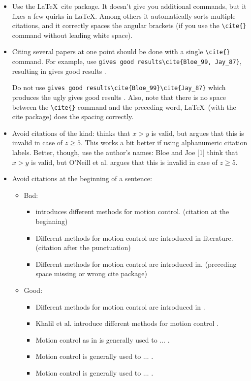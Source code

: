 \begin{itemize}
\item Use the \LaTeX~cite package. It doesn't give you additional commands, but it fixes a few quirks in \LaTeX. Among others it automatically sorts multiple citations, and it correctly spaces the angular brackets (if you use the \verb|\cite{}| command without leading white space).

\item Citing several papers at one point should be done with a single \verb|\cite{}| command. For example, use \verb|gives good results\cite{Bloe_99, Jay_87}|, resulting in gives good results \cite{Bloe_99, Jay_87}.

Do not use \verb|gives good results\cite{Bloe_99}\cite{Jay_87}| which produces the ugly gives good results \cite{Bloe_99}\cite{Jay_87}. Also, note that there is no space between the \verb|\cite{}| command and the preceding word, \LaTeX~(with the cite package) does the spacing correctly.

\item Avoid citations of the kind: \cite{Bloe_99} thinks that $x>y$ is valid, but \cite{ONeill_2000} argues that this is invalid in case of $z\geq5$. This works a bit better if using alphanumeric citation labels. Better, though, use the author's names: Bloe and Joe [1] think that $x>y$ is valid, but O'Neill et al. \cite{ONeill_2000} argues that this is invalid in case of $z\geq5$.

\item Avoid citations at the beginning of a sentence:
	\begin{itemize}
		\item Bad:
		\begin{itemize}
			\item \cite{Bloe_99} introduces different methods for motion control. (citation at the beginning)
			\item Different methods for motion control are introduced in literature. \cite{Bloe_99} (citation after the punctuation)
			\item Different methods for motion control are introduced in\cite{Bloe_99}. (preceding space missing or wrong cite package)
		\end{itemize}
		\item	Good: 	
		\begin{itemize}
			\item Different methods for motion control are introduced in \cite{Bloe_99}.
			\item Khalil et al. introduce different methods for motion control \cite{Bloe_99}.
			\item Motion control as in \cite{Bloe_99} is generally used to $\ldots$ .
			\item Motion control \cite{Bloe_99} is generally used to $\ldots$ .
			\item Motion control is generally used to $\ldots$ \cite{Bloe_99}.
		\end{itemize}
	\end{itemize}



\end{itemize}
